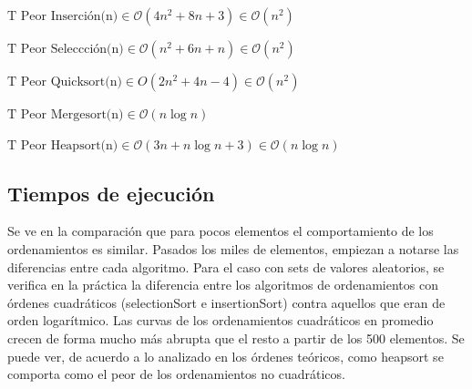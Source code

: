\documentclass[article,a4paper]{article}
\begin{document}
$\mbox{T Peor Inserción(n)} \in \mathcal O(4n^2 + 8n + 3) \in \mathcal O(n^2)$

$\mbox{T Peor Seleccción(n)} \in \mathcal O(n^2 + 6n + n) \in \mathcal O(n^2)$ 

$\mbox{T Peor Quicksort(n)} \in O(2 n ^2 + 4n - 4) \in \mathcal O(n^2)$

$\mbox{T Peor Mergesort(n)} \in \mathcal O(n \log n) $

$\mbox{T Peor Heapsort(n)} \in \mathcal O(3n + n \log n + 3) \in \mathcal O(n \log n)$

\subsection{Tiempos de ejecución}


Se ve en la comparación que para pocos elementos el comportamiento de los ordenamientos es similar. Pasados los miles de elementos, empiezan a notarse las diferencias entre cada algoritmo. Para el caso con sets de valores aleatorios, se verifica en la práctica la diferencia entre los algoritmos de ordenamientos con órdenes cuadráticos (selectionSort e insertionSort) contra aquellos que eran de orden logarítmico. Las curvas de los ordenamientos cuadráticos en promedio crecen de forma mucho más abrupta que el resto a partir de los 500 elementos. Se puede ver, de acuerdo a lo analizado en los órdenes teóricos, como heapsort se comporta como el peor de los ordenamientos no cuadráticos.\\

\\ \\
\end{document}
